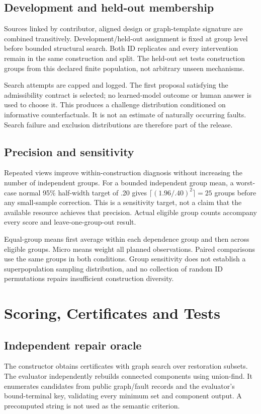 \documentclass[10pt,twocolumn,letterpaper]{article}
\begin{document}
\subsection{Development and held-out membership}
Sources linked by contributor, aligned design or graph-template
signature are combined transitively. Development/held-out assignment
is fixed at group level before bounded structural search.
Both ID replicates and every intervention remain in the same
construction and split. The held-out set tests construction groups
from this declared finite population, not arbitrary unseen mechanisms.

Search attempts are capped and logged. The first proposal satisfying
the admissibility contract is selected; no learned-model outcome
or human answer is used to choose it. This produces a challenge
distribution conditioned on informative counterfactuals. It is not
an estimate of naturally occurring faults. Search failure and
exclusion distributions are therefore part of the release.

\subsection{Precision and sensitivity}
Repeated views improve within-construction diagnosis without
increasing the number of independent groups.
For a bounded independent group mean, a worst-case normal 95\%
half-width target of .20 gives
$\lceil(1.96/.40)^2\rceil=25$ groups before any small-sample correction.
This is a sensitivity target, not a claim that the available resource
achieves that precision. Actual eligible group counts accompany
every score and leave-one-group-out result.

Equal-group means first average within each dependence group and then
across eligible groups. Micro means weight all planned observations.
Paired comparisons use the same groups in both conditions.
Group sensitivity does not establish a superpopulation sampling
distribution, and no collection of random ID permutations repairs
insufficient construction diversity.

\section{Scoring, Certificates and Tests}
\subsection{Independent repair oracle}
The constructor obtains certificates with graph search over restoration
subsets. The evaluator independently rebuilds connected components
using union-find. It enumerates candidates from public graph/fault
records and the evaluator's bound-terminal key, validating every
minimum set and component output. A precomputed string is not used
as the semantic criterion.
\end{document}
